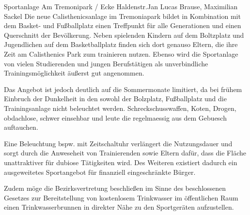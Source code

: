\documentclass{../../templates/amendment}
\date{29. Dezember 2024}
\begin{document}
\begin{boxed}{Sportanlage Am Tremonipark / Ecke Haldenstr.}{Jan Lucas Brause, Maximilian Sackel}
    Die neue Calisthenicsanlage im Tremoniapark bildet in Kombination mit dem Basket- und Fußballplatz einen Treffpunkt für alle Generationen und einen Querschnitt der Bevölkerung.
    Neben spielenden Kindern auf dem Boltzplatz und Jugendlichen auf dem Basketballplatz finden sich dort genauso Eltern, die ihre Zeit am Calisthenics Park zum trainieren nutzen.
    Ebenso wird die Sportanlage von vielen Studierenden und jungen Berufstätigen als unverbindliche Trainingsmöglichkeit äußerst gut angenommen.

    Das Angebot ist jedoch deutlich auf die Sommermonate limitiert, da bei frühem Einbruch der Dunkelheit in den sowohl der Bolzplatz, Fußballplatz und die Trainingsanlage nicht beleuchtet werden.
    Schreckschusswaffen, Koten, Drogen, obdachlose, schwer einsehbar und leute die
    regelmaessig aus dem Gebuesch auftauchen.

Eine Beleuchtung bspw. mit Zeitschaltuhr verlängert die Nutzungsdauer und sorgt durch die Anweseheit von Trainierenden sowie Eltern dafür, dass die Fläche unattraktiver für dubiose Tätigkeiten wird. Des Weiteren existiert dadurch ein ausgeweitetes Sportangebot für finanziell eingeschränkte Bürger.

Zudem möge die Bezirksvertretung beschließen im Sinne des beschlossenen Gesetzes zur Bereitstellung von kostenlosem Trinkwasser im öffentlichen Raum einen Trinkwasserbrunnen in direkter Nähe zu den Sportgeräten aufzustellen.


\end{boxed}
\end{document}
